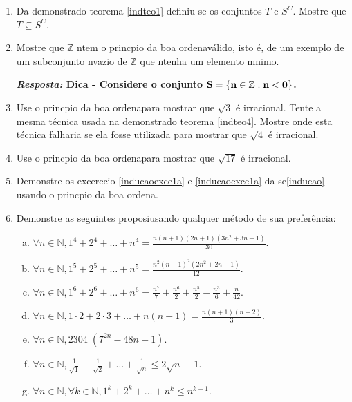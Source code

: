 \begin{enumerate}[{\bf 1.}]

\item Da demonstra\cao do teorema \ref{indteo1} definiu-se os conjuntos $T$ e $S^C$. Mostre que $T\subseteq S^C$.

\item Mostre que $\mathbb{Z}$ n\ao tem o princ\ih pio da boa ordena\cao v\'alido, isto \'e, de um exemplo de um subconjunto n\ao vazio de $\mathbb{Z}$ que n\ao tenha um elemento m\ih nimo.

{\bf{\it Resposta:} Dica - Considere o conjunto ${\bf S=\{n\in\mathbb{Z}: n<0\}}$.}

\item Use o princ\ih pio da boa ordena\cao para mostrar que $\sqrt{3}$ \'e irracional. Tente a mesma t\'ecnica usada na demonstra\cao do teorema \ref{indteo4}. Mostre onde esta t\'ecnica falharia se ela fosse utilizada para mostrar que $\sqrt{4}$ \'e irracional.

\item Use o princ\ih pio da boa ordena\cao para mostrar que $\sqrt{17}$ \'e irracional.

\item Demonstre os excerc\ih cio \ref{inducaoexce1a} e \ref{inducaoexce1a} da se\cao \ref{inducao} usando o princ\ih pio da boa ordena\caoi.

\item Demonstre as seguintes proposi\cois usando qualquer m\'etodo de sua prefer\^encia:
\begin{enumerate}[a)]
\item $\forall n\in\mathbb{N}, 1^4+2^4+\ldots+n^4=\displaystyle\frac{n(n+1)(2n+1)(3n^2+3n-1)}{30}$.
\item $\forall n\in\mathbb{N}, 1^5+2^5+\ldots+n^5=\displaystyle\frac{n^2(n+1)^2(2n^2+2n-1)}{12}$.
\item $\forall n\in\mathbb{N}, 1^6+2^6+\ldots+n^6=\displaystyle\frac{n^7}{7}+\frac{n^6}{2}+\frac{n^5}{2}-\frac{n^3}{6}+\frac{n}{42}$.
\item $\forall n\in\mathbb{N}, 1\cdot 2+ 2\cdot 3+\ldots+n(n+1)=\displaystyle\frac{n(n+1)(n+2)}{3}$.
\item $\forall n\in\mathbb{N}, 2304|(7^{2n}-48n-1)$.
\item $\forall n\in\mathbb{N}, \displaystyle\frac{1}{\sqrt{1}}+\frac{1}{\sqrt{2}}+\ldots+\frac{1}{\sqrt{n}}\leq 2\sqrt{n}-1$.
\item $\forall n\in\mathbb{N}, \forall k\in\mathbb{N}, 1^k+2^k+\ldots+n^k\leq n^{k+1}$.
\end{enumerate}


\end{enumerate}

